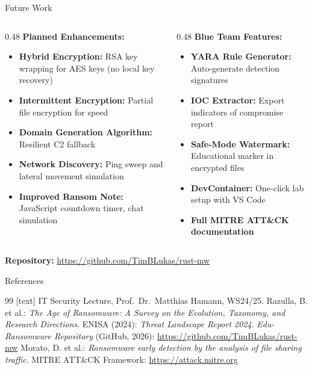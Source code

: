 \documentclass[aspectratio=169]{beamer}
\begin{document}
\begin{frame}{Future Work}
  \begin{columns}[T]
    \begin{column}{0.48\textwidth}
      \textbf{Planned Enhancements:}
      \begin{itemize}
        \item \textbf{Hybrid Encryption:} RSA key wrapping for AES keys (no local key recovery)
        \item \textbf{Intermittent Encryption:} Partial file encryption for speed
        \item \textbf{Domain Generation Algorithm:} Resilient C2 fallback
        \item \textbf{Network Discovery:} Ping sweep and lateral movement simulation
        \item \textbf{Improved Ransom Note:} JavaScript countdown timer, chat simulation
      \end{itemize}
    \end{column}
    \begin{column}{0.48\textwidth}
      \textbf{Blue Team Features:}
      \begin{itemize}
        \item \textbf{YARA Rule Generator:} Auto-generate detection signatures
        \item \textbf{IOC Extractor:} Export indicators of compromise report
        \item \textbf{Safe-Mode Watermark:} Educational marker in encrypted files
        \item \textbf{DevContainer:} One-click lab setup with VS Code
        \item \textbf{Full MITRE ATT\&CK documentation}
      \end{itemize}
    \end{column}
  \end{columns}

  \vspace{0.8em}
  \begin{center}
    \textbf{Repository:} \url{https://github.com/TimBLukas/rust-mw}
  \end{center}
\end{frame}

\begin{frame}{References}
  \begin{thebibliography}{99}
    [text]
     IT Security Lecture, Prof.\ Dr.\ Matthias Hamann, WS24/25.
     Razulla, B. et al.: \textit{The Age of Ransomware: A Survey on the Evolution, Taxonomy, and Research Directions}.
     ENISA (2024): \textit{Threat Landscape Report 2024}.
     \textit{Edu-Ransomware Repository} (GitHub, 2026): \url{https://github.com/TimBLukas/rust-mw}
     Morato, D. et al.: \textit{Ransomware early detection by the analysis of file sharing traffic}.
     MITRE ATT\&CK Framework: \url{https://attack.mitre.org}
  \end{thebibliography}
\end{frame}
\end{document}
